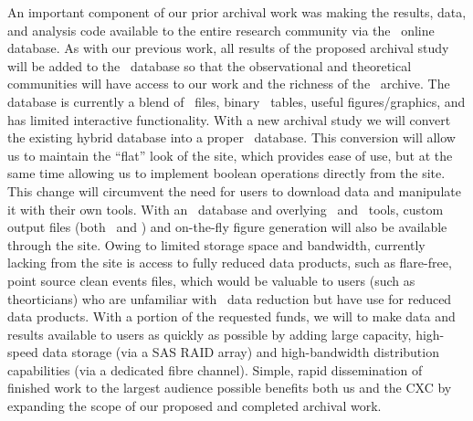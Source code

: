 \documentclass[letterpaper,11pt]{article}
\begin{document}
\large
\begin{center}
\end{center}
\normalsize

An important component of our prior archival work was making the
results, data, and analysis code available to the entire research
community via the \accept\ online database. As with our previous work,
all results of the proposed archival study will be added to the
\accept\ database so that the observational and theoretical
communities will have access to our work and the richness of the
\chandra\ archive. The database is currently a blend of \ascii\ files,
binary \fits\ tables, useful figures/graphics, and has limited
interactive functionality. With a new archival study we will convert
the existing hybrid database into a proper \sql\ database. This
conversion will allow us to maintain the ``flat'' look of the site,
which provides ease of use, but at the same time allowing us to
implement boolean operations directly from the site. This change will
circumvent the need for users to download data and manipulate it with
their own tools. With an \sql\ database and overlying \perl\ and
\python\ tools, custom output files (both \ascii\ and \fits) and
on-the-fly figure generation will also be available through the
site. Owing to limited storage space and bandwidth, currently lacking
from the site is access to fully reduced data products, such as
flare-free, point source clean events files, which would be valuable
to users (such as theorticians) who are unfamiliar with \chandra\ data
reduction but have use for reduced data products. With a portion of
the requested funds, we will to make data and results available to
users as quickly as possible by adding large capacity, high-speed data
storage (via a SAS RAID array) and high-bandwidth distribution
capabilities (via a dedicated fibre channel). Simple, rapid
dissemination of finished work to the largest audience possible
benefits both us and the CXC by expanding the scope of our proposed
and completed archival work.
\end{document}
